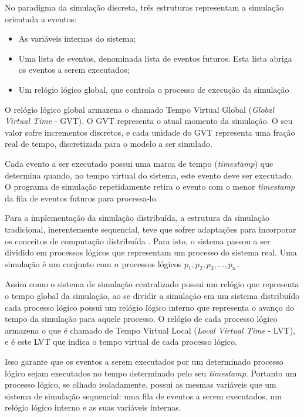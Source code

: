 No paradigma da simulação discreta, três estruturas representam a simulação orientada a eventos:

\begin{itemize}
\item As variáveis internas do sistema;
\item Uma lista de eventos, denominada lista de eventos futuros. Esta lista abriga os eventos a serem executados;
\item Um relógio lógico global, que controla o processo de execução da simulação
\end{itemize}

O relógio lógico global armazena o chamado Tempo Virtual Global (\textit{Global Virtual Time} - GVT). O GVT representa o atual momento da simulação. O seu valor sofre incrementos discretos, e cada unidade do GVT representa uma fração real de tempo, discretizada para o modelo a ser simulado.

Cada evento a ser executado possui uma marca  de tempo (\textit{timestamp}) que determina quando, no tempo virtual do sistema, este evento deve ser executado. O programa de simulação repetidamente retira o evento com o menor \textit{timestamp} da fila de eventos futuros para processa-lo.

Para a implementação da simulação distribuída, a estrutura da simulação tradicional, inerentemente sequencial, teve que sofrer adaptações para incorporar os conceitos de computação distribuída \cite{REED-MALONY}. Para isto, o sistema passou a ser dividido em processos lógicos que representam um processo do sistema real. Uma simulação é um conjunto com $n$ processos lógicos $p_{1}, p_{2}, p_{3}, ..., p_{n}$.


Assim como o sistema de simulação centralizado possui um relógio que representa o tempo global da simulação, ao se dividir a simulação em um sistema distribuído cada processo lógico possui um relógio lógico interno que representa o avanço do tempo da simulação para aquele processo. O relógio de cada processo lógico armazena o que é chamado de Tempo Virtual Local (\textit{Local Virtual Time} - LVT), e é este LVT que indica o tempo virtual de cada processo lógico.

Isso garante que os eventos a serem executados por um determinado processo lógico sejam executados no tempo determinado pelo seu \textit{timestamp}. Portanto um processo lógico, se olhado isoladamente, possui as mesmas variáveis que um sistema de simulação sequencial: uma fila de eventos a serem executados, um relógio lógico interno e as suas variáveis internas.

